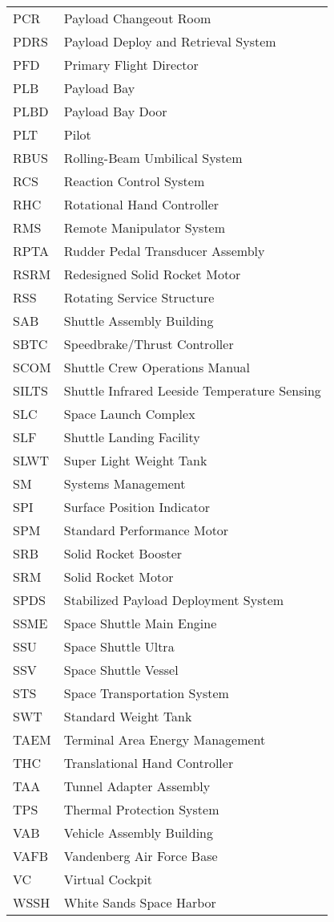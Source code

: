 \documentclass[Space_Shuttle_Vessel_Manual.tex]{subfiles}
\begin{document}
\begin{longtable}{l l }
PCR & Payload Changeout Room\\
PDRS & Payload Deploy and Retrieval System\\
PFD & Primary Flight Director\\
PLB & Payload Bay\\
PLBD & Payload Bay Door\\
PLT & Pilot\\
RBUS & Rolling-Beam Umbilical System\\
RCS & Reaction Control System\\
RHC & Rotational Hand Controller\\
RMS & Remote Manipulator System\\
RPTA & Rudder Pedal Transducer Assembly\\
RSRM & Redesigned Solid Rocket Motor\\
RSS & Rotating Service Structure\\
SAB & Shuttle Assembly Building\\
SBTC & Speedbrake/Thrust Controller\\
SCOM & Shuttle Crew Operations Manual\\
SILTS & Shuttle Infrared Leeside Temperature Sensing\\
SLC & Space Launch Complex\\
SLF & Shuttle Landing Facility\\
SLWT & Super Light Weight Tank\\
SM & Systems Management\\
SPI & Surface Position Indicator\\
SPM & Standard Performance Motor\\
SRB & Solid Rocket Booster\\
SRM & Solid Rocket Motor\\
SPDS & Stabilized Payload Deployment System\\
SSME & Space Shuttle Main Engine\\
SSU & Space Shuttle Ultra\\
SSV & Space Shuttle Vessel\\
STS & Space Transportation System\\
SWT & Standard Weight Tank\\
TAEM & Terminal Area Energy Management\\
THC & Translational Hand Controller\\
TAA & Tunnel Adapter Assembly\\
TPS & Thermal Protection System\\
VAB & Vehicle Assembly Building\\
VAFB & Vandenberg Air Force Base\\
VC & Virtual Cockpit\\
WSSH & White Sands Space Harbor\\
\end{longtable}
\end{document}
